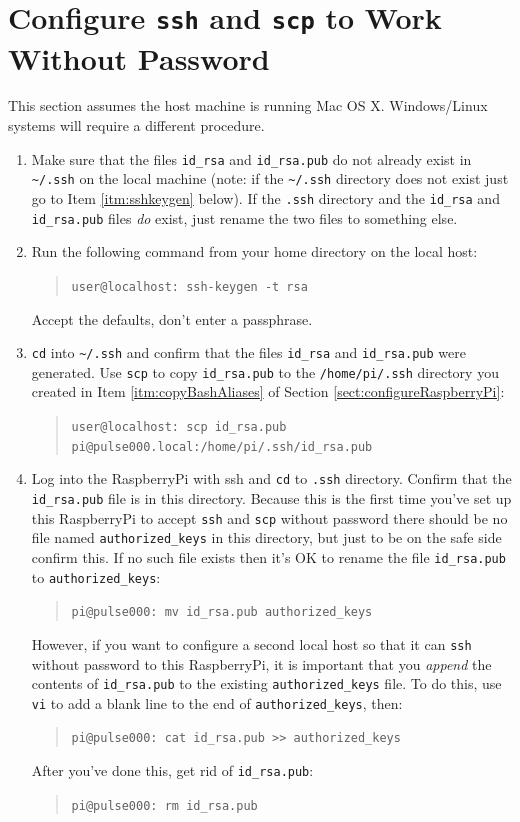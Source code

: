 \documentclass[11pt,oneside]{article}
\makeatletter
\newcommand{\localCommand}[1]{\begin{quote} \texttt{user@localhost: #1} \end{quote}}
\newcommand{\remoteCommandAfterRename}[1]{\begin{quote} \texttt{pi@pulse000: #1} \end{quote}}
\makeatother
\begin{document}
\section{Configure \texttt{ssh} and \texttt{scp} to Work Without Password} \label{sect:configureWorkWithoutPassword}
This section assumes the host machine is running Mac OS X.  Windows/Linux systems will require a different procedure.
\begin{enumerate}
	\item \label{itm:genIdRsa} Make sure that the files \texttt{id\_rsa} and \texttt{id\_rsa.pub} do not already exist in \texttt{{\textasciitilde}/.ssh} on the local machine
	(note: if the \texttt{{\textasciitilde}/.ssh} directory
	does not exist just go to Item \ref{itm:sshkeygen} below).  If the \texttt{.ssh} directory and the \texttt{id\_rsa} and \texttt{id\_rsa.pub} files {\em do} exist, just rename the two files to something else.
	\item \label{itm:sshkeygen} Run the following command from your home directory on the local host: \localCommand{ssh-keygen -t rsa}
	Accept the defaults, don't enter a passphrase.
	\item \texttt{cd} into \texttt{{\textasciitilde}/.ssh} and confirm that the files \texttt{id\_rsa} and \texttt{id\_rsa.pub} were generated.  Use \texttt{scp} to copy \texttt{id\_rsa.pub} to the
	\texttt{/home/pi/.ssh} directory you created in Item \ref{itm:copyBashAliases} of Section \ref{sect:configureRaspberryPi}: \localCommand{scp id\_rsa.pub pi@pulse000.local:/home/pi/.ssh/id\_rsa.pub}
	\item Log into the RaspberryPi with ssh and \texttt{cd} to \texttt{.ssh} directory.  Confirm that the \texttt{id\_rsa.pub} file is in this directory.  Because this is the first time you've set up this
	RaspberryPi to accept \texttt{ssh} and \texttt{scp} without password there should be no file named \texttt{authorized\_keys} in this directory, but just to be on the safe side confirm this.  If no such
	file exists then it's OK to rename the file \texttt{id\_rsa.pub} to \texttt{authorized\_keys}: \remoteCommandAfterRename{mv id\_rsa.pub authorized\_keys}
	However, if you want to configure a second local host so that it can \texttt{ssh} without password to this RaspberryPi, it is important that you {\em append} the contents of \texttt{id\_rsa.pub}
	to the existing \texttt{authorized\_keys} file.  To do this, use \texttt{vi} to add a blank line to the end of \texttt{authorized\_keys}, then: \remoteCommandAfterRename{cat id\_rsa.pub >> authorized\_keys}
	After you've done this, get rid of \texttt{id\_rsa.pub}: \remoteCommandAfterRename{rm id\_rsa.pub}

\end{enumerate}
\end{document}
